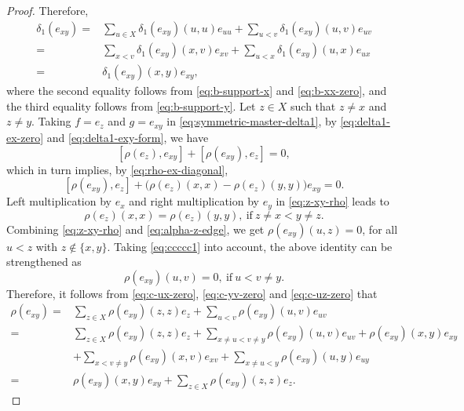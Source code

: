 \documentclass[reqno]{amsart}
\numberwithin{equation}{section}
\theoremstyle{plain}
\theoremstyle{definition}
\begin{document}
\begin{proof}
Therefore,
\begin{align}
\delta_1(e_{xy})=&\sum_{u\in X}\delta_1(e_{xy})(u,u)e_{uu}+\sum_{u<v}\delta_1(e_{xy})(u,v)e_{uv}\nonumber\\
=&\sum_{x< v}\delta_1(e_{xy})(x,v)e_{xv}+\sum_{u< x}\delta_1(e_{xy})(u,x)e_{ux}\nonumber\\
=&\delta_1(e_{xy})(x,y)e_{xy},\label{eq:delta1-exy-form}
\end{align}
where the second equality follows from \eqref{eq:b-support-x} and \eqref{eq:b-xx-zero},
and the third equality follows from \eqref{eq:b-support-y}.
Let $z\in X$ such that $z\neq x$ and $z\neq y$. Taking $f=e_z$ and $g=e_{xy}$ in \eqref{eq:symmetric-master-delta1},
by \eqref{eq:delta1-ex-zero} and \eqref{eq:delta1-exy-form}, we have
\[
[\rho(e_{z}),e_{xy}]+[\rho(e_{xy}),e_z]=0,
\]
which in turn implies, by \eqref{eq:rho-ex-diagonal},
\begin{equation}\label{eq:z-xy-rho}
[\rho(e_{xy}),e_z]
+\bigl(\rho(e_{z})(x,x)-\rho(e_{z})(y,y)\bigr)e_{xy}=0.
\end{equation}
Left multiplication by $e_x$ and right multiplication by $e_y$ in \eqref{eq:z-xy-rho} leads to
\begin{equation}\label{eq:alpha-z-edge}
\rho(e_{z})(x,x)=\rho(e_{z})(y,y),~\text{if}~z\neq x<y\neq z.
\end{equation}
Combining \eqref{eq:z-xy-rho} and \eqref{eq:alpha-z-edge}, we get
$\rho(e_{xy})(u,z)=0$, for all $u<z$ with $z\notin\{x,y\}$. Taking \eqref{eq:ccccc1} into account,
the above identity can be strengthened as
\begin{equation}\label{eq:c-uz-zero}
\rho(e_{xy})(u,v)=0,~\text{if}~u<v\neq y.
\end{equation}
Therefore, it follows from \eqref{eq:c-ux-zero}, \eqref{eq:c-yv-zero} and \eqref{eq:c-uz-zero} that
\begin{align}
\rho(e_{xy})=&\sum_{z\in X}\rho(e_{xy})(z,z)e_{z}+\sum_{u< v}\rho(e_{xy})(u,v)e_{uv}\nonumber\\
=&\sum_{z\in X}\rho(e_{xy})(z,z)e_{z}+\sum_{x\neq u<v\neq y}\rho(e_{xy})(u,v)e_{uv}+\rho(e_{xy})(x,y)e_{xy}\nonumber\\
&+\sum_{x<v\neq y}\rho(e_{xy})(x,v)e_{xv}+\sum_{x\neq u<y}\rho(e_{xy})(u,y)e_{uy}
\nonumber\\
=&\rho(e_{xy})(x,y)e_{xy}+\sum_{z\in X}\rho(e_{xy})(z,z)e_{z}.\label{00}
\end{align}


\end{proof}
\end{document}
